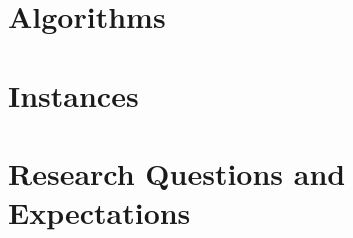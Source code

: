 \documentclass{article}
\begin{document}


\section{Algorithms}

\section{Instances}

\section{Research Questions and Expectations}
%
\end{document}
